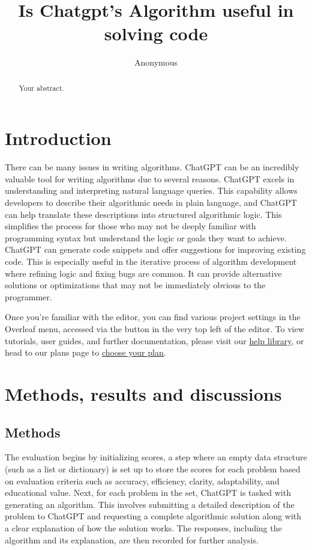 \documentclass{article}
\title{Is Chatgpt's Algorithm useful in solving code }
\author{Anonymous}
\begin{document}
\maketitle

\begin{abstract}
Your abstract.
\end{abstract}

\section{Introduction}

There can be many issues in writing algorithms. 
ChatGPT can be an incredibly valuable tool for writing algorithms due to several reasons. ChatGPT excels in understanding and interpreting natural language queries. This capability allows developers to describe their algorithmic needs in plain language, and ChatGPT can help translate these descriptions into structured algorithmic logic. This simplifies the process for those who may not be deeply familiar with programming syntax but understand the logic or goals they want to achieve. ChatGPT can generate code snippets and offer suggestions for improving existing code. This is especially useful in the iterative process of algorithm development where refining logic and fixing bugs are common. It can provide alternative solutions or optimizations that may not be immediately obvious to the programmer.

Once you're familiar with the editor, you can find various project settings in the Overleaf menu, accessed via the button in the very top left of the editor. To view tutorials, user guides, and further documentation, please visit our \href{https://www.overleaf.com/learn}{help library}, or head to our plans page to \href{https://www.overleaf.com/user/subscription/plans}{choose your plan}.

\section{Methods, results and discussions}

\subsection{Methods}

The evaluation begins by initializing scores, a step where an empty data structure (such as a list or dictionary) is set up to store the scores for each problem based on evaluation criteria such as accuracy, efficiency, clarity, adaptability, and educational value. Next, for each problem in the set, ChatGPT is tasked with generating an algorithm. This involves submitting a detailed description of the problem to ChatGPT and requesting a complete algorithmic solution along with a clear explanation of how the solution works. The responses, including the algorithm and its explanation, are then recorded for further analysis.
\end{document}
